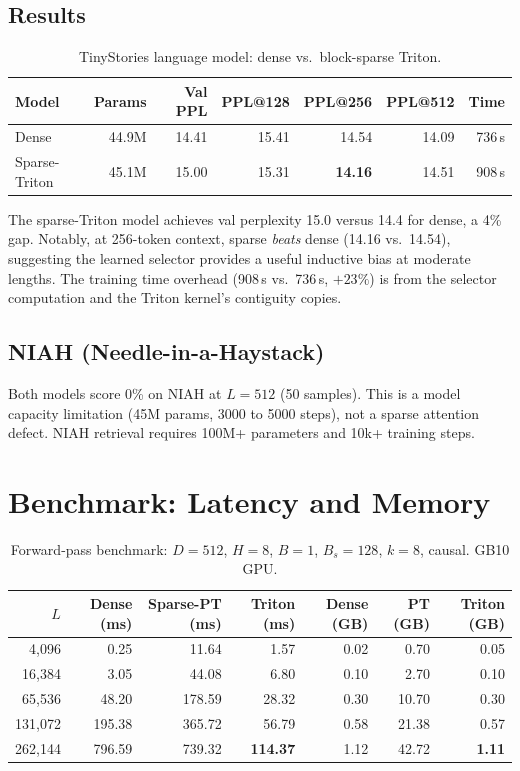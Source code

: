 \documentclass[10pt,letterpaper]{article}
\begin{document}
\subsection{Results}

\begin{table}[h]
\centering
\caption{TinyStories language model: dense vs.\ block-sparse Triton.}
\label{tab:lm}
\small
\begin{tabular}{lrrrrrr}
\toprule
Model & Params & Val PPL & PPL@128 & PPL@256 & PPL@512 & Time \\
\midrule
Dense & 44.9M & 14.41 & 15.41 & 14.54 & 14.09 & 736\,s \\
Sparse-Triton & 45.1M & 15.00 & 15.31 & \textbf{14.16} & 14.51 & 908\,s \\
\bottomrule
\end{tabular}
\end{table}

The sparse-Triton model achieves val perplexity 15.0 versus 14.4 for
dense, a 4\% gap. Notably, at 256-token context, sparse \emph{beats} dense
(14.16 vs.\ 14.54), suggesting the learned selector provides a useful
inductive bias at moderate lengths. The training time overhead (908\,s vs.\
736\,s, $+23\%$) is from the selector computation and the Triton kernel's
contiguity copies.

\subsection{NIAH (Needle-in-a-Haystack)}

Both models score 0\% on NIAH at $L=512$ (50 samples). This is a model
capacity limitation (45M params, 3000 to 5000 steps), not a sparse attention
defect. NIAH retrieval requires 100M+ parameters and 10k+ training steps.

\section{Benchmark: Latency and Memory}\label{sec:bench}

\begin{table}[h]
\centering
\caption{Forward-pass benchmark: $D{=}512$, $H{=}8$, $B{=}1$, $B_s{=}128$,
$k{=}8$, causal. GB10 GPU.}
\label{tab:bench}
\small
\begin{tabular}{rrrrrrr}
\toprule
$L$ & Dense (ms) & Sparse-PT (ms) & Triton (ms) & Dense (GB) & PT (GB) & Triton (GB) \\
\midrule
4,096 & 0.25 & 11.64 & 1.57 & 0.02 & 0.70 & 0.05 \\
16,384 & 3.05 & 44.08 & 6.80 & 0.10 & 2.70 & 0.10 \\
65,536 & 48.20 & 178.59 & 28.32 & 0.30 & 10.70 & 0.30 \\
131,072 & 195.38 & 365.72 & 56.79 & 0.58 & 21.38 & 0.57 \\
262,144 & 796.59 & 739.32 & \textbf{114.37} & 1.12 & 42.72 & \textbf{1.11} \\
\bottomrule
\end{tabular}
\end{table}
\end{document}
